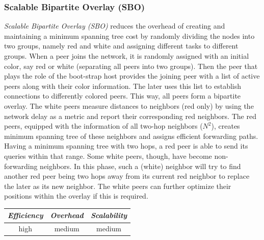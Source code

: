 \subsubsection{Scalable Bipartite Overlay (SBO)}
\emph{Scalable Bipartite Overlay (SBO)}
\cite{LXN2004,LXN2007} reduces the overhead of creating
and maintaining a minimum spanning tree cost by randomly dividing the nodes into
two groups, namely red and white and assigning different tasks to different
groups. When a peer joins the network, it is randomly assigned with an initial
color, say red or white (separating all peers into two groups). Then the peer
that plays the role of the boot-strap host provides the joining peer with a list
of active peers along with their color information. The later uses this list to
establish connections to differently colored peers. This way, all peers form a
bipartite overlay. The white peers measure distances to neighbors (red only) by
using the network delay as a metric and report their corresponding red
neighbors. The red peers, equipped with the information of all two-hop
neighbors ($N^2$), creates minimum spanning tree of these neighbors and
assigns efficient forwarding paths. Having a minimum spanning tree with two
hops, a red peer is able to send its queries within that range. Some white
peers, though, have become non-forwarding neighbors. In this phase, such a
(white) neighbor will try to find another red peer being two hops away from its
current red neighbor to replace the later as its new neighbor. The white peers
can further optimize their positions within the overlay if this is required.

%
%
%

\begin{center}
\begin{tabular}{ccc}
\emph{Efficiency} & \emph{Overhead} & \emph{Scalability} \\
\hline
high &
medium &
%
medium
\end{tabular}
\end{center}

